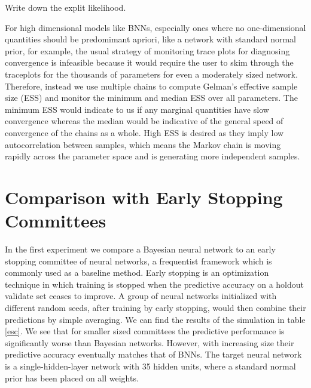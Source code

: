 \documentclass[12pt]{report}
\begin{document}
Write down the explit likelihood.


For high dimensional models like BNNs, especially ones where no one-dimensional quantities should be predomimant apriori, like a network with standard normal prior, for example, the usual strategy of monitoring trace plots for diagnosing convergence is infeasible because it would require the user to skim through the traceplots for the thousands of parameters for even a moderately sized network. Therefore, instead we use multiple chains to compute Gelman's effective sample size (ESS) and monitor the minimum and median ESS over all parameters. The minimum ESS would indicate to us if any marginal quantities have slow convergence whereas the median would be indicative of the general speed of convergence of the chains as a whole. High ESS is desired as they imply low autocorrelation between samples, which means the Markov chain is moving rapidly across the parameter space and is generating more independent samples.

\section{Comparison with Early Stopping Committees}

In the first experiment we compare a Bayesian neural network to an early stopping committee of neural networks, a frequentist framework which is commonly used as a baseline method. Early stopping is an optimization technique in which training is stopped when the predictive accuracy on a holdout validate set ceases to improve. A group of neural networks initialized with different random seeds, after training by early stopping,  would then combine their predictions by simple averaging. We can find the results of the simulation in table \ref{esc}. We see that for smaller sized committees the predictive performance is significantly worse than Bayesian networks. However, with increasing size their predictive accuracy eventually matches that of BNNs. The target neural network is a single-hidden-layer network with 35 hidden units, where a standard normal prior has been placed on all weights. 
\end{document}
